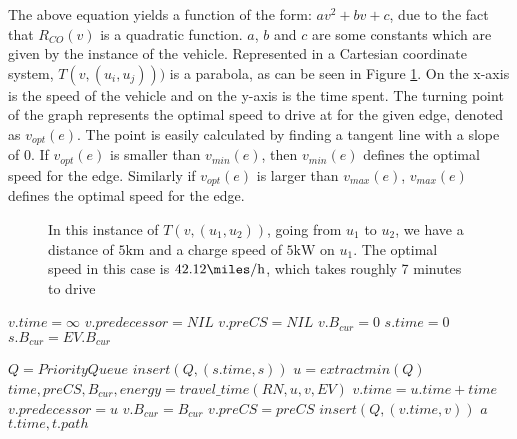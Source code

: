 The above equation yields a function of the form: $av^2 + bv + c$, due to the fact that $R_{CO}(v)$ is a quadratic function. $a$, $b$ and $c$ are some constants which are given by the instance of the vehicle. Represented in a Cartesian coordinate system, $T(v,(u_i, u_j)))$ is a parabola, as can be seen in Figure \ref{fig:graph}. On the x-axis is the speed of the vehicle and on the y-axis is the time spent. The turning point of the graph represents the optimal speed to drive at for the given edge, denoted as $v_{opt}(e)$. The point is easily calculated by finding a tangent line with a slope of $0$. If $v_{opt}(e)$ is smaller than $v_{min}(e)$, then $v_{min}(e)$ defines the optimal speed for the edge. Similarly if $v_{opt}(e)$ is larger than $v_{max}(e)$, $v_{max}(e)$ defines the optimal speed for the edge.


\begin{figure}[!htb]
\label{fig:graph}
% 
\caption{In this instance of $T(v,(u_1, u_2))$, going from $u_1$ to $u_2$, we have a distance of $5 \si{\km}$ and a charge speed of $5 \si{\kW}$ on $u_1$. The optimal speed in this case is $42.12\si{\miles\per\hour}$, which takes roughly 7 minutes to drive}
\end{figure}



\begin{algorithmic}
		\State $v.time = \infty$
		\State $v.predecessor = NIL$
		\State $v.preCS = NIL$
		\State $v.B_{cur} = 0$
	\EndFor
	\State $s.time = 0$
	\State $s.B_{cur} = EV.B_{cur}$

	\State $Q = PriorityQueue$
	\State $insert(Q, (s.time, s))$	
		\State $u = extractmin(Q)$
			\State $time,preCS,B_{cur},energy = travel\_time(RN, u, v, EV)$
				\State $v.time = u.time + time$
				\State $v.predecessor = u$
				\State $v.B_{cur} = B_{cur}$
				\State $v.preCS = preCS$
				\State $insert(Q, (v.time, v))$	
			\EndIf
				\State $a$
			\EndIf
		\EndFor
	\EndWhile
	\State \Return $t.time, t.path$
\EndFunction
\end{algorithmic}\label{alg:fastest_path}

